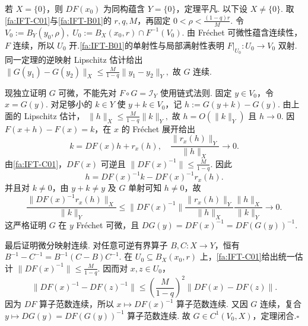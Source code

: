 \begin{FAProof}
若 \(\displaystyle X=\{0\}\)，则 \(\displaystyle DF(x_0)\) 为同构蕴含 \(\displaystyle Y=\{0\}\)，定理平凡. 以下设 \(\displaystyle X\neq\{0\}\). 取\autoref{fa:IFT-C01}与\autoref{fa:IFT-B01}的 \(\displaystyle r,q,M\)，再固定
\(\displaystyle 0<\rho<\frac{(1-q)r}{M}.\)
令
\(\displaystyle V_0:=B_Y(y_0,\rho), \; U_0:=B_X(x_0,r)\cap F^{-1}(V_0).\)
由 Fréchet 可微性蕴含连续性，\(\displaystyle F\) 连续，所以 \(\displaystyle U_0\) 开.\autoref{fa:IFT-B01}的单射性与局部满射性表明 \(\displaystyle F|_{U_0}:U_0\to V_0\) 双射. 同一定理的逆映射 Lipschitz 估计给出
\(\displaystyle \|G(y_1)-G(y_2)\|_X \leqslant \frac{M}{1-q}\|y_1-y_2\|_Y,\)
故 \(\displaystyle G\) 连续.

现独立证明 \(\displaystyle G\) 可微，不能先对 \(\displaystyle F\circ G=\mathcal I_Y\) 使用链式法则. 固定 \(\displaystyle y\in V_0\)，令 \(\displaystyle x=G(y)\). 对足够小的 \(\displaystyle k\in Y\) 使 \(\displaystyle y+k\in V_0\)，记
\(\displaystyle h:=G(y+k)-G(y).\)
由上面的 Lipschitz 估计，
\(\displaystyle \|h\|_X \leqslant \frac{M}{1-q}\|k\|_Y,\)
故 \(\displaystyle h=O(\|k\|_Y)\) 且 \(\displaystyle h\to0\). 因 \(\displaystyle F(x+h)-F(x)=k\)，在 \(\displaystyle x\) 的 Fréchet 展开给出
\[
k
=
DF(x)h+r_x(h),
\quad
\frac{\|r_x(h)\|_Y}{\|h\|_X}
\longrightarrow0.
\]
由\autoref{fa:IFT-C01}，\(\displaystyle DF(x)\) 可逆且 \(\displaystyle\|DF(x)^{-1}\|\leqslant \frac{M}{1-q}\). 因此
\[
h = DF(x)^{-1}k-DF(x)^{-1}r_x(h).
\]
并且对 \(\displaystyle k\neq0\)，由 \(\displaystyle y+k\neq y\) 及 \(\displaystyle G\) 单射可知 \(\displaystyle h\neq0\)，故
\[
\frac{\|DF(x)^{-1}r_x(h)\|_X}{\|k\|_Y}
\leqslant
\|DF(x)^{-1}\|
\frac{\|r_x(h)\|_Y}{\|h\|_X}
\frac{\|h\|_X}{\|k\|_Y}
\longrightarrow0.
\]
这严格证明 \(\displaystyle G\) 在 \(\displaystyle y\) Fréchet 可微，且
\(\displaystyle DG(y)=DF(x)^{-1}=DF(G(y))^{-1}.\)

最后证明微分映射连续. 对任意可逆有界算子 \(\displaystyle B,C:X\to Y\)，恒有
\(\displaystyle B^{-1}-C^{-1} = B^{-1}(C-B)C^{-1}.\)
在 \(\displaystyle U_0\subseteq B_X(x_0,r)\) 上，\autoref{fa:IFT-C01}给出统一估计 \(\displaystyle\|DF(x)^{-1}\|\leqslant \frac{M}{1-q}\). 因而对 \(\displaystyle x,z\in U_0\)，
\[
\|DF(x)^{-1}-DF(z)^{-1}\|
\leqslant
\left(\frac{M}{1-q}\right)^2
\|DF(x)-DF(z)\|.
\]
因为 \(\displaystyle DF\) 算子范数连续，所以 \(\displaystyle x\mapsto DF(x)^{-1}\) 算子范数连续. 又因 \(\displaystyle G\) 连续，复合
\(\displaystyle y\longmapsto DG(y)=DF(G(y))^{-1}\)
算子范数连续. 故 \(\displaystyle G\in C^1(V_0,X)\)，定理闭合.\hfill\(\square\)

\end{FAProof}

